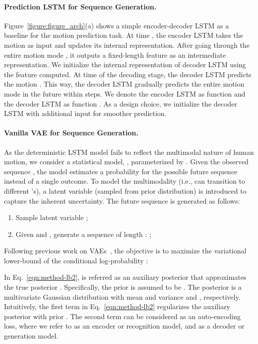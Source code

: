 \documentclass[runningheads]{llncs}
\begin{document}
\paragraph{Prediction LSTM for Sequence Generation.}
Figure~\ref{figure:figure_arch}(a) shows a simple encoder-decoder LSTM \cite{hochreiter1997long,srivastava2015unsupervised} as a baseline for the motion prediction task.
At time , the encoder LSTM takes the motion  as input and updates its internal representation.
After going through the entire motion mode , it outputs a fixed-length feature  as an intermediate representation.
We initialize the internal representation of decoder LSTM using the feature  computed.
At time  of the decoding stage, the decoder LSTM predicts the motion .
This way, the decoder LSTM gradually predicts the entire motion mode  in the future within  steps.
We denote the encoder LSTM as function  and the decoder LSTM as function .
As a design choice, we initialize the decoder LSTM with additional input  for smoother prediction.


\vspace*{-0.1in}
\paragraph{Vanilla VAE for Sequence Generation.}
As the deterministic LSTM model fails to reflect the multimodal nature of human motion, we consider a statistical model, , parameterized by .
Given the observed sequence , the model estimates a probability for the possible future sequence  instead of a single outcome.
To model the multimodality (i.e.,  can transition to different 's), a latent variable  (sampled from prior distribution) is introduced to capture the inherent uncertainty.
The future sequence  is generated as follows:
\begin{enumerate}
\item Sample latent variable ;
\item Given  and , generate a sequence of length : ; 
\vspace*{-0.2cm}
\end{enumerate}

Following previous work on VAEs~\cite{kingma2013auto,sohn2015learning,gregor2015draw,yan2016attribute2image,walker2016uncertain,xue2016visual,walker2017pose},
the objective is to maximize the variational lower-bound of the conditional log-probability :

In Eq.~\ref{eqn:method-lb2},  is referred as an auxiliary posterior that approximates the true posterior .
Specifically, the prior  is assumed to be .
The posterior  is a multivariate Gaussian distribution with mean and variance  and , respectively.
Intuitively, the first term in Eq.~\ref{eqn:method-lb2} regularizes the auxiliary posterior  with prior .
The second term  can be considered as an auto-encoding loss, where we refer to  as an encoder or recognition model, and  as a decoder or generation model.
\end{document}
